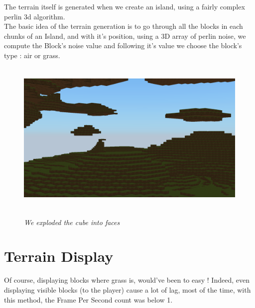\documentclass[article]{report} %
\begin{document}
				The terrain itself is generated when we create an island, using a fairly complex perlin 3d algorithm. \\
				The basic idea of the terrain generation is to go through all the blocks in each chunks of an Island, and with it's position,  using a 3D array of perlin noise, we compute the Block's noise value and following it's value we choose the block's type : air or grass.
				\begin{figure}[h]
					\includegraphics[width=16cm, height=7.5cm]{Images/Screenshot/Mountains02.png}
					\begin{center}\it We exploded the cube into faces \end{center}
				\end{figure}
\newpage				
			\section{Terrain Display}
				Of course, displaying blocks where grass is, would've been to easy ! Indeed, even displaying visible blocks (to the player) cause a lot of lag, most of the time, with this method, the Frame Per Second count was below 1. \\
				
\end{document}
